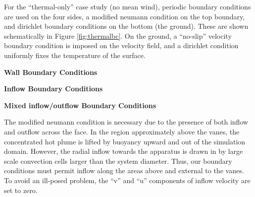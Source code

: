 


For the ``thermal-only'' case study (no mean wind), 
periodic boundary conditions are used on the four sides, a modified
neumann condition\cite{gunzburger1989finite} on the top boundary, and
dirichlet boundary conditions on the bottom (the ground). These are shown schematically in Figure
\ref{fig:thermalbc}. On the ground, a ``no-slip'' velocity boundary
condition is imposed on the velocity field, and a dirichlet condition
uniformly fixes the temperature of the surface. 

\textbf{Wall Boundary Conditions} 

\textbf{Inflow Boundary Conditions} 



\textbf{Mixed inflow/outflow Boundary Conditions} 

The modified neumann condition is necessary due to the presence of both
inflow and outflow across the face. In the region approximately above
the vanes, the concentrated hot plume is lifted by buoyancy
upward and out of the simulation domain. However, the radial inflow
towards the apparatus is drawn in by large scale convection cells larger
than the system diameter. Thus, our boundary conditions must permit
inflow along the areas above and external to the vanes. To avoid an
ill-posed problem, the ``v'' and ``u'' components of inflow velocity are
set to zero.


